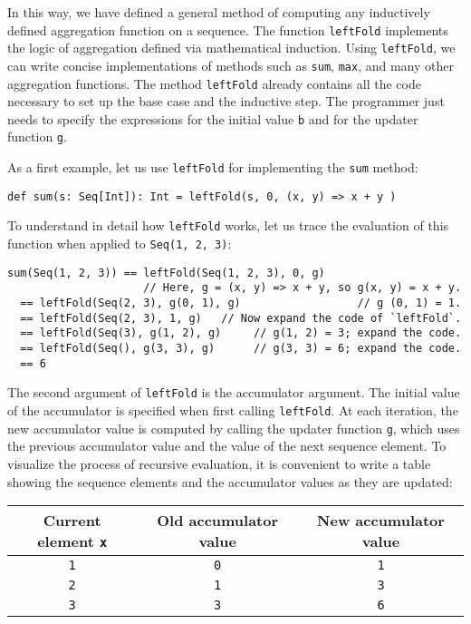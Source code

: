 In this way, we have defined a general method of computing any inductively
defined aggregation function on a sequence. The function \lstinline!leftFold!
implements the logic of aggregation defined via
mathematical induction. Using \lstinline!leftFold!, we can write
concise implementations of methods such as \lstinline!sum!, \lstinline!max!,
and many other aggregation functions. The method \lstinline!leftFold!
already contains all the code necessary to set up the base case and
the inductive step. The programmer just needs to specify the expressions
for the initial value \lstinline!b! and for the updater function
\lstinline!g!.

As a first example, let us use \lstinline!leftFold! for implementing
the \lstinline!sum! method:
\begin{lstlisting}
def sum(s: Seq[Int]): Int = leftFold(s, 0, (x, y) => x + y )
\end{lstlisting}
To understand in detail how \lstinline!leftFold! works, let us trace
the evaluation of this function when applied to \lstinline!Seq(1, 2, 3)!:
\begin{lstlisting}
sum(Seq(1, 2, 3)) == leftFold(Seq(1, 2, 3), 0, g)
                     // Here, g = (x, y) => x + y, so g(x, y) = x + y.
  == leftFold(Seq(2, 3), g(0, 1), g)                  // g (0, 1) = 1.
  == leftFold(Seq(2, 3), 1, g)   // Now expand the code of `leftFold`.
  == leftFold(Seq(3), g(1, 2), g)     // g(1, 2) = 3; expand the code.
  == leftFold(Seq(), g(3, 3), g)      // g(3, 3) = 6; expand the code.
  == 6
\end{lstlisting}
The second argument of \lstinline!leftFold! is the accumulator argument.
The initial value of the accumulator is specified when first calling
\lstinline!leftFold!. At each iteration, the new accumulator value
is computed by calling the updater function \lstinline!g!, which
uses the previous accumulator value and the value of the next sequence
element. To visualize the process of recursive evaluation, it is convenient
to write a table showing the sequence elements and the accumulator
values as they are updated:
\begin{center}
\begin{tabular}{|c|c|c|}
\hline 
\textbf{\small{}Current element }\lstinline!x! & \textbf{\small{}Old accumulator value} & \textbf{\small{}New accumulator value}\tabularnewline
\hline 
\hline 
{\small{}}\lstinline!1! & {\small{}}\lstinline!0! & {\small{}}\lstinline!1!\tabularnewline
\hline 
{\small{}}\lstinline!2! & {\small{}}\lstinline!1! & {\small{}}\lstinline!3!\tabularnewline
\hline 
{\small{}}\lstinline!3! & {\small{}}\lstinline!3! & {\small{}}\lstinline!6!\tabularnewline
\hline 
\end{tabular}
\par\end{center}

